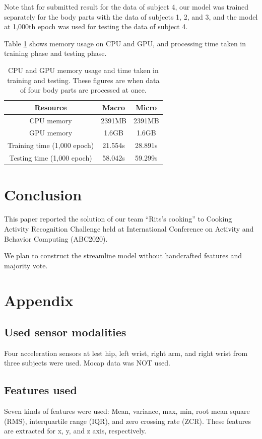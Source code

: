 \documentclass{svmult}
\begin{document}
Note that for submitted result for the data of subject 4, our model was trained separately for the body parts with the data of subjects 1, 2, and 3, and the model at 1,000th epoch was used for testing the data of subject 4.

Table \ref{tab:resources} shows memory usage on CPU and GPU, and processing time taken in training phase and testing phase.

\begin{table}[!h]
    \caption{CPU and GPU memory usage and time taken in training and testing. These figures are when data of four body parts are processed at once.}
    \centering
    \begin{tabular}{c|c|c}\hline\hline
         Resource& Macro & Micro  \\\hline
         CPU memory& 2391MB &2391MB\\
         GPU memory& 1.6GB& 1.6GB\\
         Training time (1,000 epoch)& 21.554s & 28.891s \\
         Testing time (1,000 epoch)& 58.042s & 59.299s \\\hline
    \end{tabular}
    \label{tab:resources}
\end{table}


\section{Conclusion}
\label{sec:conclusion}
This paper reported the solution of our team ``Rits's cooking'' to Cooking Activity Recognition Challenge held at International Conference on Activity and Behavior Computing (ABC2020).

We plan to construct the streamline model without handcrafted features and majority vote.




\section*{Appendix}
\subsection*{Used sensor modalities}
Four acceleration sensors at lest hip, left wrist, right arm, and right wrist from three subjects were used. Mocap data was NOT used.

\subsection*{Features used}
Seven kinds of features were used: Mean, variance, max, min, root mean square (RMS), interquartile range (IQR), and zero crossing rate (ZCR).
These features are extracted for x, y, and z axis, respectively.
\end{document}
